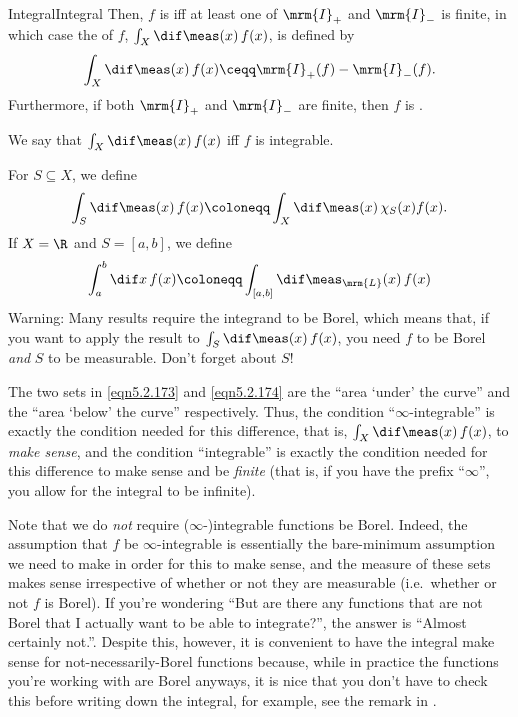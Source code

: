 \begin{dfn}{Integral}{Integral}
Then, $f$ is  iff at least one of $\mrm{I}_+$ and $\mrm{I}_-$ is finite, in which case the  of $f$, $\int _X\dif \meas (x)\, f(x)$, is defined by
\begin{equation}\label{eqn5.2.175}
\int _X\dif \meas (x)\, f(x)\ceqq \mrm{I}_+(f)-\mrm{I}_-(f).
\end{equation}
Furthermore, if both $\mrm{I}_+$ and $\mrm{I}_-$ are finite, then $f$ is .
\begin{rmk}
We say that $\int _X\dif \meas (x)\, f(x)$  iff $f$ is integrable.
\end{rmk}
\begin{rmk}
For $S\subseteq X$, we define
\begin{equation}
\int _S\dif \meas (x)\, f(x)\coloneqq \int _X\dif \meas (x)\, \chi _S(x)f(x).
\end{equation}
If $X=\R$ and $S=[a,b]$, we define
\begin{equation}
\int _a^b\dif x\, f(x)\coloneqq \int _{[a,b]}\dif \meas _{\mrm{L}}(x)\, f(x)
\end{equation}
\noindent Warning:  Many results require the integrand to be Borel, which means that, if you want to apply the result to $\int _S\dif \meas (x)\, f(x)$, you need $f$ to be Borel \emph{and} $S$ to be measurable.  Don't forget about $S$!
\end{rmk}
\begin{rmk}
The two sets in \eqref{eqn5.2.173} and \eqref{eqn5.2.174} are the ``area `under' the curve'' and the ``area `below' the curve'' respectively.  Thus, the condition ``$\infty$-integrable'' is exactly the condition needed for this difference, that is, $\int _X\dif \meas (x)\, f(x)$, to \emph{make sense}, and the condition ``integrable'' is exactly the condition needed for this difference to make sense and be \emph{finite} (that is, if you have the prefix ``$\infty$'', you allow for the integral to be infinite).
\end{rmk}
\begin{rmk}
Note that we do \emph{not} require ($\infty$-)integrable functions be Borel.  Indeed, the assumption that $f$ be $\infty$-integrable is essentially the bare-minimum assumption we need to make in order for this to make sense, and the measure of these sets makes sense irrespective of whether or not they are measurable (i.e.~whether or not $f$ is Borel).  If you're wondering ``But are there any functions that are not Borel that I actually want to be able to integrate?'', the answer is ``Almost certainly not.''.  Despite this, however, it is convenient to have the integral make sense for not-necessarily-Borel functions because, while in practice the functions you're working with are Borel anyways, it is nice that you don't have to check this before writing down the integral, for example, see the remark in .

\end{rmk}
\end{dfn}
